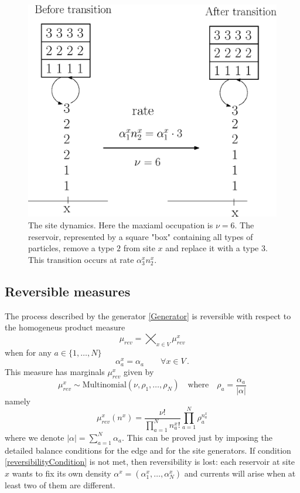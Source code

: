 \documentclass[10pt]{article}
\numberwithin{equation}{section}
\numberwithin{equation}{subsection}
\newcommand{\twoj}{\nu}
\begin{document}
\begin{figure}
    \centering
    \includegraphics[scale=0.4]{BoundaryStirring.eps}
    \caption{The site dynamics. Here the maxiaml occupation is $\nu=6$. The reservoir, represented by a square "box" containing all types of particles, remove a type $2$ from site $x$ and replace it with a type $3$. This transition occurs at rate $\alpha_{3}^{x}n_{2}^{x}$.}
    \label{fig:2}
\end{figure}
\subsection{Reversible measures}
The process described by the generator \eqref{Generator} is reversible with respect to the homogeneus product measure \begin{equation}\label{reversibleMeasure}
\mu_{rev}=\bigtimes_{x\in V}\mu_{rev}^{x}
\end{equation}
when for any $a\in\{1,\ldots,N\}$
\begin{equation}\label{reversibilityCondition}
\alpha_{a}^{x}=\alpha_{a}\qquad \forall x\in V\,.
\end{equation}
This measure has marginals $\mu_{rev}^{x}$ given by 
\begin{equation}
 \mu^{x}_{rev}\sim \text{Multinomial}\left(\twoj,\rho_{1},\ldots,\rho_{N}\right)\quad \text{where}\quad \rho_{a}=\frac{\alpha_{a}}{|\alpha|}
\end{equation}
namely
\begin{equation}
\mu_{rev}^{x}(n^{x})=\frac{\nu!}{\prod_{a=1}^{N}n_{a}^{x}!}\prod_{a=1}^{N}\rho_{a}^{n_{a}^{x}}
\end{equation}
where we denote $|\alpha|=\sum_{a=1}^{N}\alpha_{a}$. 
This can be proved just by imposing the detailed balance conditions for the edge and for the site generators. If condition \eqref{reversibilityCondition} is not met, then reversibility is lost: each reservoir at site $x$ wants to fix its own density $\alpha^{x}=(\alpha_{1}^{x},\ldots,\alpha_{N}^{x})$ and currents will arise when at least two of them are different. 
\end{document}
